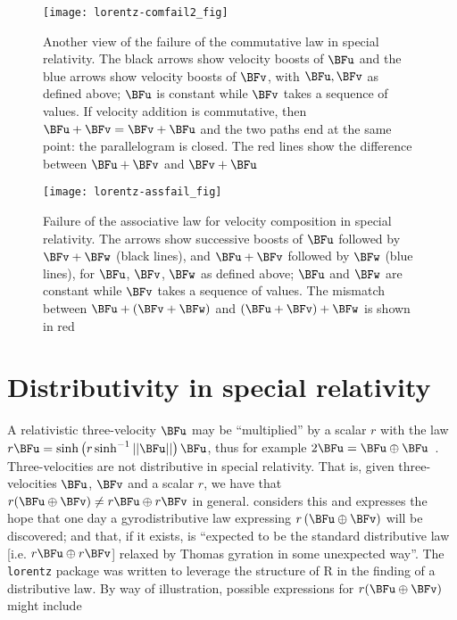 \documentclass[ijoc,nonblindrev]{informs3} %
\begin{document}
\begin{figure}[htbp]
  \begin{center}
\texttt{[image: lorentz-comfail2\_fig]}
\caption{Another view of the failure of the commutative
  law\label{comfail2} in special relativity.  The black arrows show
  velocity boosts of $\BFu$ and the blue arrows show velocity boosts of
  $\BFv$, with $\BFu,\BFv$ as defined above; $\BFu$ is constant while
  $\BFv$ takes a sequence of values.  If velocity addition is
  commutative, then $\BFu+\BFv=\BFv+\BFu$ and the two paths end at the
  same point: the parallelogram is closed.  The red lines show the
  difference between $\BFu+\BFv$ and $\BFv+\BFu$}
  \end{center}
\end{figure}

\begin{figure}[htbp]
  \begin{center}
\texttt{[image: lorentz-assfail\_fig]}
\caption{Failure of the associative law \label{assfail} for velocity
  composition in special relativity.  The arrows show successive
  boosts of $\BFu$ followed by $\BFv+\BFw$ (black lines), and $\BFu+\BFv$
  followed by $\BFw$ (blue lines), for $\BFu$, $\BFv$, $\BFw$ as defined
  above; $\BFu$ and $\BFw$ are constant while $\BFv$ takes a sequence of
  values. The mismatch between $\BFu+\left(\BFv+\BFw\right)$ and
  $\left(\BFu+\BFv\right)+\BFw$ is shown in red}
  \end{center}
\end{figure}


\section{Distributivity in special relativity}

A relativistic three-velocity $\BFu$ may be ``multiplied'' by a scalar
$r$ with the law
$r\BFu=\sinh\left(r\sinh^{-1}\left|\left|\BFu\right|\right|\right)\BFu$,
thus for example $2\BFu=\BFu\oplus\BFu$~\citep{ungar1997}.
Three-velocities are not distributive in special relativity.  That is,
given three-velocities $\BFu$, $\BFv$ and a scalar $r$, we have that
$r(\BFu\oplus\BFv)\neq r\BFu\oplus r\BFv$ in general.
\cite{ungar1997} considers this and expresses the hope that one day a
gyrodistributive law expressing $r\left(\BFu\oplus\BFv\right)$ will be
discovered; and that, if it exists, is ``expected to be the standard
distributive law [i.e. $r\BFu\oplus r\BFv$] relaxed by Thomas gyration
in some unexpected way''.  The {\tt lorentz} package was written to
leverage the structure of R in the finding of a distributive law.  By
way of illustration, possible expressions for $r(\BFu\oplus\BFv)$ might
include
\end{document}
